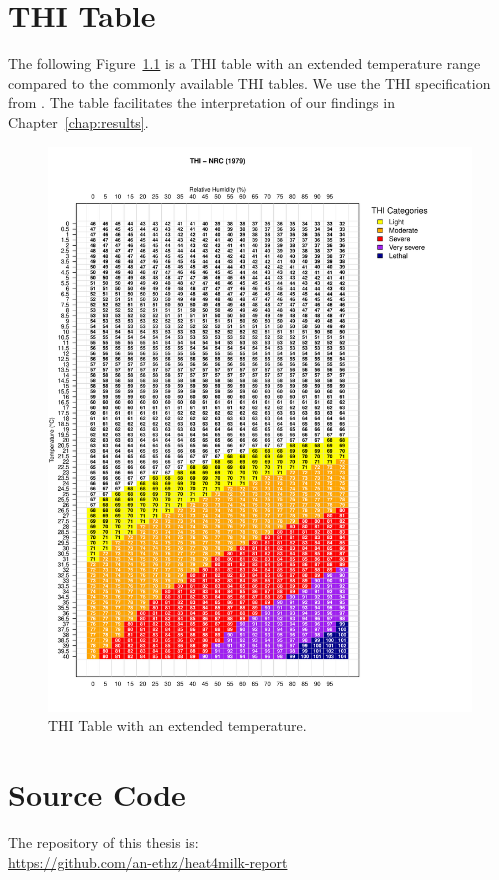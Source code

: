 \newpage
\chapter{THI Table}
The following Figure~\ref{fig:thi_table} is a THI table with an extended temperature range compared to the commonly available THI tables. We use the THI specification from \cite{nrc_1971}. The table facilitates the interpretation of our findings in Chapter~\ref{chap:results}.
\begin{figure}[H]
    \centering
    \includegraphics[width=\textwidth]{thesis/figures/THI_NRC_extended.pdf}
    \caption[]{THI Table with an extended temperature.}
    \label{fig:thi_table}
\end{figure}
\newpage


\chapter{Source Code}\label{appendix:source_code}
\begin{center}
The repository of this thesis is: \\
\href{https://github.com/an-ethz/heat4milk-report}{https://github.com/an-ethz/heat4milk-report}
\end{center}
